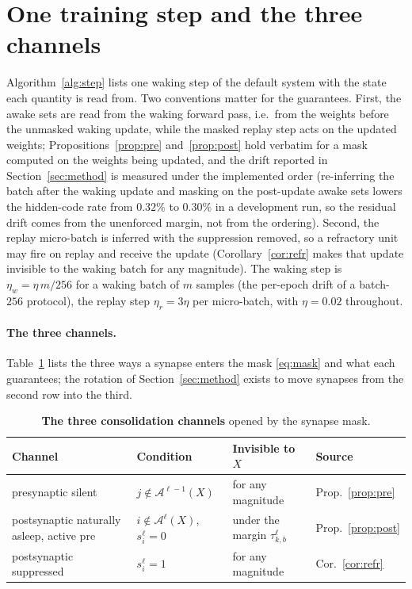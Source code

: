 \documentclass{article}
\begin{document}
\section{One training step and the three channels}
\label{app:alg}
Algorithm~\ref{alg:step} lists one waking step of the default system with the state each
quantity is read from. Two conventions matter for the guarantees. First, the awake sets are
read from the waking forward pass, i.e.\ from the weights before the unmasked waking update,
while the masked replay step acts on the updated weights;
Propositions~\ref{prop:pre} and~\ref{prop:post} hold verbatim for a mask computed on the
weights being updated, and the drift reported in Section~\ref{sec:method} is measured under
the implemented order (re-inferring the batch after the waking update and masking on the
post-update awake sets lowers the hidden-code rate from $0.32\%$ to $0.30\%$ in a development
run, so the residual drift comes from the unenforced margin, not from the ordering). Second,
the replay micro-batch is inferred with the suppression removed, so a refractory unit may fire
on replay and receive the update (Corollary~\ref{cor:refr} makes that update invisible to the
waking batch for any magnitude). The waking step is $\eta_w=\eta\,m/256$ for a waking batch
of $m$ samples (the per-epoch drift of a batch-$256$ protocol), the replay step
$\eta_r=3\eta$ per micro-batch, with $\eta=0.02$ throughout.

\paragraph{The three channels.} Table~\ref{tab:channels} lists the three ways a synapse
enters the mask \eqref{eq:mask} and what each guarantees; the rotation of
Section~\ref{sec:method} exists to move synapses from the second row into the third.

\begin{table}[h]
\centering\small
\begin{tabular}{llll}
\toprule
Channel & Condition & Invisible to $X$ & Source \\
\midrule
presynaptic silent & $j\notin\mathcal{A}^{\ell-1}(X)$ & for any magnitude & Prop.~\ref{prop:pre} \\
postsynaptic naturally asleep, active pre & $i\notin\mathcal{A}^{\ell}(X)$, $s^\ell_i=0$ & under the margin $\tau^\ell_{k,b}$ & Prop.~\ref{prop:post} \\
postsynaptic suppressed & $s^\ell_i=1$ & for any magnitude & Cor.~\ref{cor:refr} \\
\bottomrule
\end{tabular}
\caption{\textbf{The three consolidation channels} opened by the synapse mask.}
\label{tab:channels}
\end{table}
\end{document}
